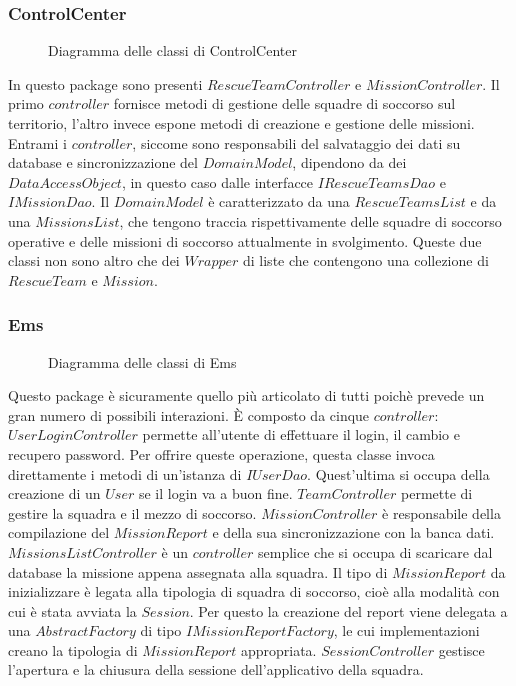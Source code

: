 \documentclass{article}
\begin{document}
    \subsubsection{ControlCenter}
    \begin{figure}
        \centering
        
        \caption{Diagramma delle classi di ControlCenter}
        \label{fig:uml-controlcenter}
    \end{figure}
    In questo package sono presenti $RescueTeamController$ e $MissionController$. Il primo $controller$ fornisce metodi di gestione delle squadre di soccorso sul territorio,
    l'altro invece espone metodi di creazione e gestione delle missioni.
    Entrami i $controller$, siccome sono responsabili del salvataggio dei dati su database e sincronizzazione del $DomainModel$, dipendono da dei $DataAccessObject$, in questo caso dalle interfacce $IRescueTeamsDao$ e $IMissionDao$.
    Il $DomainModel$ è caratterizzato da una $RescueTeamsList$ e da una $MissionsList$, che tengono traccia rispettivamente delle squadre di soccorso operative e delle missioni di soccorso attualmente in svolgimento.
    Queste due classi non sono altro che dei $Wrapper$ di liste che contengono una collezione di $RescueTeam$ e $Mission$.
    \subsubsection{Ems}
    \begin{figure}
        \centering
        
        \caption{Diagramma delle classi di Ems}
        \label{fig:uml-ems}
    \end{figure}
    Questo package è sicuramente quello più articolato di tutti poichè prevede un gran numero di possibili interazioni.
    È composto da cinque $controller$:
    \newline $UserLoginController$ permette all'utente di effettuare il login, il cambio e recupero password.
    Per offrire queste operazione, questa classe invoca direttamente i metodi di un'istanza di $IUserDao$.
    Quest'ultima si occupa della creazione di un $User$ se il login va a buon fine.
    \newline $TeamController$ permette di gestire la squadra e il mezzo di soccorso.
    \newline $MissionController$ è responsabile della compilazione del $MissionReport$ e della sua sincronizzazione con la banca dati.
    \newline $MissionsListController$ è un $controller$ semplice che si occupa di scaricare dal database la missione appena assegnata alla squadra.
    Il tipo di $MissionReport$ da inizializzare è legata alla tipologia di squadra di soccorso, cioè alla modalità con cui è stata avviata la $Session$.
    Per questo la creazione del report viene delegata a una $AbstractFactory$ di tipo $IMissionReportFactory$, le cui implementazioni creano la tipologia di $MissionReport$ appropriata.
    \newline $SessionController$ gestisce l'apertura e la chiusura della sessione dell'applicativo della squadra.
\end{document}
